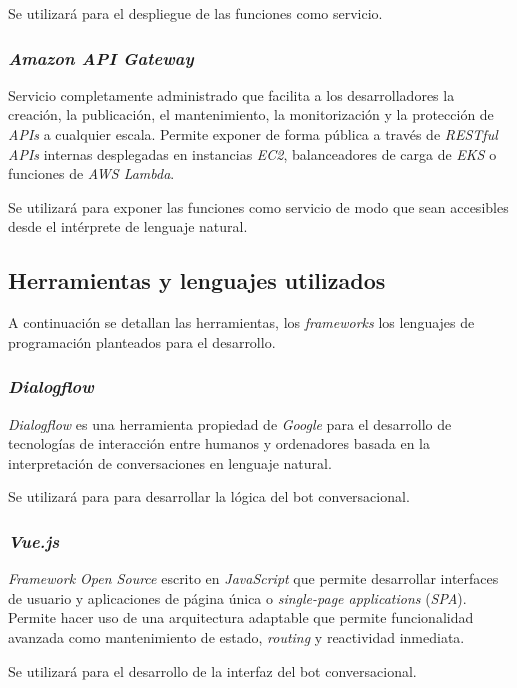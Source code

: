 \documentclass[11pt,spanish,listoffigures]{tfgetsinf}
\begin{document}
Se utilizará para el despliegue de las funciones como servicio.


\subsubsection{\textit{Amazon API Gateway}}

Servicio completamente administrado que facilita a los desarrolladores la creación, la publicación, el mantenimiento, la monitorización y la protección de \textit{APIs} a cualquier escala. Permite exponer de forma pública a través de \textit{RESTful APIs} internas desplegadas en instancias \textit{EC2}, balanceadores de carga de \textit{EKS} o funciones de \textit{AWS Lambda}.

Se utilizará para exponer las funciones como servicio de modo que sean accesibles desde el intérprete de lenguaje natural.


\subsection{Herramientas y lenguajes utilizados}
\label{subsec:herramientas-y-lenguajes}

A continuación se detallan las herramientas, los \textit{frameworks} los lenguajes de programación planteados para el desarrollo.

\subsubsection{\textit{Dialogflow}}

\textit{Dialogflow} es una herramienta propiedad de \textit{Google} para el desarrollo de tecnologías de interacción entre humanos y ordenadores basada en la interpretación de conversaciones en lenguaje natural. 

Se utilizará para para desarrollar la lógica del bot conversacional.


\subsubsection{\textit{Vue.js}}
\textit{Framework Open Source} escrito en \textit{JavaScript} que permite desarrollar interfaces de usuario y aplicaciones de página única o \textit{single-page applications} (\textit{SPA}). Permite hacer uso de una arquitectura adaptable que permite funcionalidad avanzada como mantenimiento de estado, \textit{routing} y reactividad inmediata.

Se utilizará para el desarrollo de la interfaz del bot conversacional.
\end{document}
